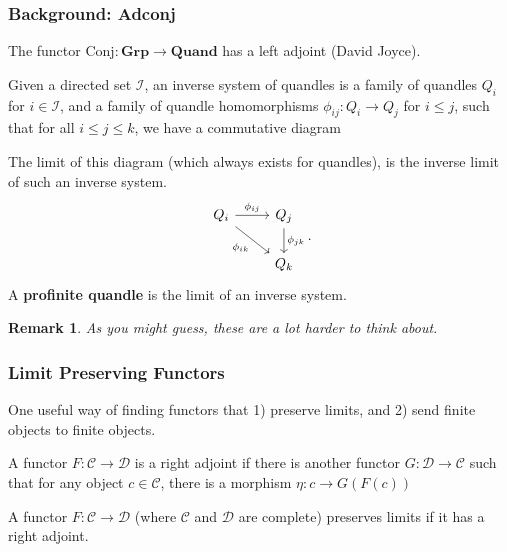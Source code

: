 \documentclass[10pt]{beamer}
\newcommand{\Conj}{\mathrm{Conj}} %
\theoremstyle{plain}
\newtheorem{remark}{Remark}
\begin{document}
\begin{frame}[fragile]
    \frametitle{Background: Adconj}
    The functor $ \Conj:\mathbf{Grp} \to \mathbf{Quand} $ has a left adjoint (David Joyce).

    \begin{definition}
        Given a directed set $\mathcal{I}$, an inverse system of quandles is a family of quandles $ Q_i $ for $i\in \mathcal{I}$, and a family of quandle homomorphisms $ \phi_{ij}:Q_i\to Q_j $ for $i\le j$,
        such that for all $i\le j\le k$, we have a commutative diagram

        The limit of this diagram (which always exists for quandles), is the inverse limit of such an inverse system.
        \[\begin{tikzcd}
            Q_i & Q_j \\
            & Q_k
            \arrow["\phi_{ij}", from=1-1, to=1-2]
            \arrow["\phi_{ik}"', from = 1-1, to=2-2]
            \arrow["\phi_{jk}", from=1-2, to=2-2]
        \end{tikzcd}.\]
        A \textbf{profinite quandle} is the limit of an inverse system.
    \end{definition}

    
    \pause

    \begin{remark}
        As you might guess, these are a lot harder to think about. 
    \end{remark}

\end{frame}



    \begin{frame}
        \frametitle{Limit Preserving Functors}

        One useful way of finding functors that 1) preserve limits, and 2) send finite objects to finite objects.

        \begin{definition}
            A functor $F:\mathcal{C}\to \mathcal{D}$  is a right adjoint if there is another functor $ G:\mathcal{D}\to \mathcal{C} $ such that for any object $c\in \mathcal{C}$, there is a morphism $\eta : c\to G(F(c)) $
        \end{definition}

        \begin{theorem}
            A functor $F:\mathcal{C}\to \mathcal{D}$ (where $\mathcal{C}$ and $\mathcal{D}$ are complete) preserves limits if it has a right adjoint.
        \end{theorem}
    \end{frame}
\end{document}
